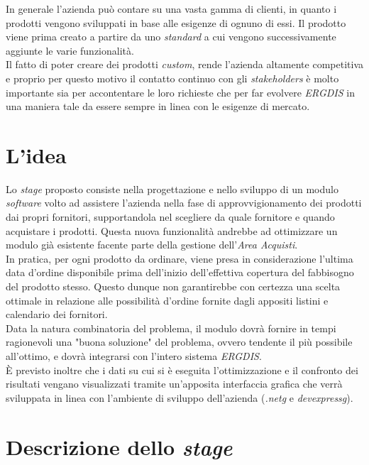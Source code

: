 \noindent In generale l'azienda può contare su una vasta gamma di clienti,
in quanto i prodotti vengono sviluppati in base alle esigenze di ognuno di essi.
Il prodotto viene prima creato a partire da uno \textit{standard}
a cui vengono successivamente aggiunte le varie funzionalità.\\
Il fatto di poter creare dei prodotti \textit{custom}, rende l'azienda altamente competitiva
e proprio per questo motivo il contatto
continuo con gli \textit{stakeholders} è molto importante sia per accontentare le loro richieste che per
far evolvere \textit{ERGDIS} in una maniera tale da essere sempre in linea con le esigenze di mercato.


\section{L'idea}
\noindent Lo \textit{stage} proposto consiste nella progettazione e nello sviluppo di un modulo \textit{software} volto
ad assistere l'azienda nella fase di approvvigionamento dei prodotti dai propri fornitori, supportandola nel scegliere
da quale fornitore e quando acquistare i prodotti.
\noindent Questa nuova funzionalità andrebbe ad ottimizzare un modulo già esistente facente parte della
gestione dell'\textit{Area Acquisti}.\\
In pratica, per ogni prodotto da ordinare, viene presa in considerazione l'ultima data d'ordine disponibile prima dell'inizio
dell'effettiva copertura del fabbisogno del prodotto stesso. Questo dunque non garantirebbe con certezza una scelta ottimale
in relazione alle possibilità d'ordine fornite dagli appositi listini e calendario dei fornitori.\\

\noindent Data la natura combinatoria del problema, il modulo dovrà fornire in tempi ragionevoli una "buona soluzione"
del problema, ovvero tendente il più possibile all'ottimo, e dovrà integrarsi con l'intero sistema \textit{ERGDIS}.\\

\noindent È previsto inoltre che i dati su cui si è eseguita l'ottimizzazione e il confronto dei risultati vengano visualizzati tramite un'apposita
interfaccia grafica che verrà sviluppata in linea con l'ambiente di sviluppo dell'azienda (\textit{\gls{.netg}} e \textit{\gls{devexpressg}}).


\section{Descrizione dello \textit{stage}}

